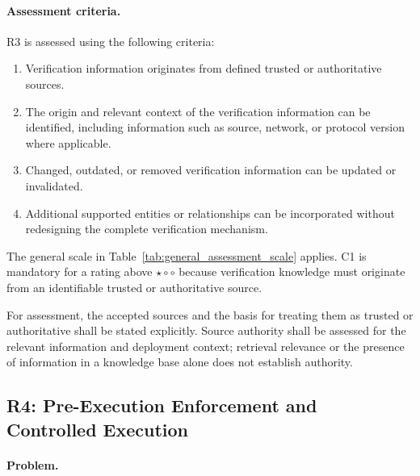 \paragraph{Assessment criteria.}

R3 is assessed using the following criteria:

\begin{enumerate}
    \item[\textbf{C1}] Verification information originates from defined
    trusted or authoritative sources.

    \item[\textbf{C2}] The origin and relevant context of the verification
    information can be identified, including information such as source,
    network, or protocol version where applicable.

    \item[\textbf{C3}] Changed, outdated, or removed verification information
    can be updated or invalidated.

    \item[\textbf{C4}] Additional supported entities or relationships can be
    incorporated without redesigning the complete verification mechanism.
\end{enumerate}


The general scale in Table~\ref{tab:general_assessment_scale} applies.
C1 is mandatory for a rating above $\star\circ\circ$ because verification
knowledge must originate from an identifiable trusted or authoritative source.

For assessment, the accepted sources and the basis for treating them as
trusted or authoritative shall be stated explicitly. Source authority
shall be assessed for the relevant information and deployment context;
retrieval relevance or the presence of information in a knowledge base
alone does not establish authority.

\subsection{R4: Pre-Execution Enforcement and Controlled Execution}
\label{subsec:r4_enforcement}

\paragraph{Problem.}

